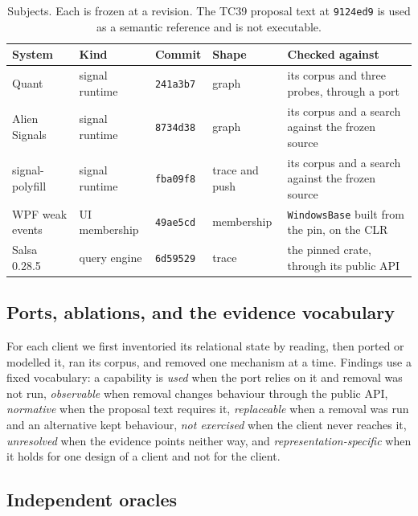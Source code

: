 \documentclass[11pt]{article}
\begin{document}
\begin{table}[tbp]
\centering
\footnotesize
\begin{tabular}{l l l l p{5.4cm}}
\toprule
System & Kind & Commit & Shape & Checked against \\
\midrule
Quant \cite{quant} & signal runtime & \texttt{241a3b7} & graph & its corpus and three probes, through a port \\
Alien Signals \cite{aliensignals} & signal runtime & \texttt{8734d38} & graph & its corpus and a search against the frozen source \\
signal-polyfill \cite{signalpolyfill} & signal runtime & \texttt{fba09f8} & trace and push & its corpus and a search against the frozen source \\
WPF weak events \cite{wpf} & UI membership & \texttt{49ae5cd} & membership & \texttt{WindowsBase} built from the pin, on the CLR \\
Salsa 0.28.5 \cite{salsa} & query engine & \texttt{6d59529} & trace & the pinned crate, through its public API \\
\bottomrule
\end{tabular}
\caption{Subjects. Each is frozen at a revision. The TC39 proposal text at \texttt{9124ed9} is used as a semantic reference and is not executable.}
\label{tab:subjects}
\end{table}

\subsection{Ports, ablations, and the evidence vocabulary}

For each client we first inventoried its relational state by reading, then ported or modelled it, ran its corpus, and removed one mechanism at a time. Findings use a fixed vocabulary: a capability is \emph{used} when the port relies on it and removal was not run, \emph{observable} when removal changes behaviour through the public API, \emph{normative} when the proposal text requires it, \emph{replaceable} when a removal was run and an alternative kept behaviour, \emph{not exercised} when the client never reaches it, \emph{unresolved} when the evidence points neither way, and \emph{representation-specific} when it holds for one design of a client and not for the client.

\subsection{Independent oracles}
\end{document}
